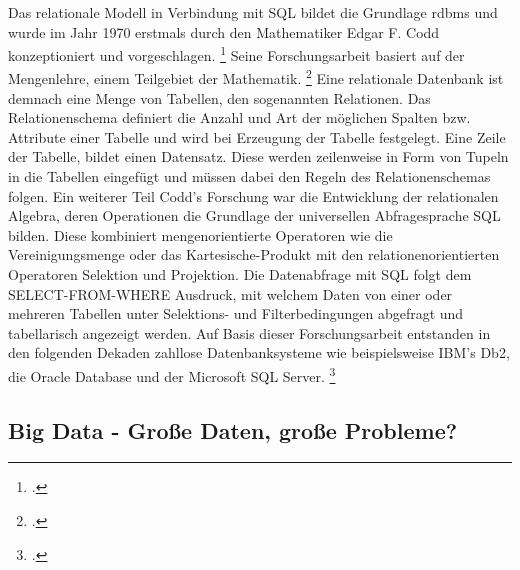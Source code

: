 Das relationale Modell in Verbindung mit SQL bildet die Grundlage \ac{rdbms} und wurde im Jahr 1970 erstmals durch den Mathematiker Edgar F. Codd konzeptioniert und vorgeschlagen. \footcite{coddRelationalModelData1970} Seine Forschungsarbeit basiert auf der Mengenlehre, einem Teilgebiet der Mathematik. \footcite[S. 66]{langerDevelopingPathData2023} Eine relationale Datenbank ist demnach eine Menge von Tabellen, den sogenannten Relationen. Das Relationenschema definiert die Anzahl und Art der möglichen Spalten bzw. Attribute einer Tabelle und wird bei Erzeugung der Tabelle festgelegt. Eine Zeile der Tabelle, bildet einen Datensatz. Diese werden zeilenweise in Form von Tupeln in die Tabellen eingefügt und müssen dabei den Regeln des Relationenschemas folgen. Ein weiterer Teil Codd's Forschung war die Entwicklung der relationalen Algebra, deren Operationen die Grundlage der universellen Abfragesprache SQL bilden. Diese kombiniert mengenorientierte Operatoren wie die Vereinigungsmenge oder das Kartesische-Produkt mit den relationenorientierten Operatoren Selektion und Projektion. Die Datenabfrage mit SQL folgt dem SELECT-FROM-WHERE Ausdruck, mit welchem Daten von einer oder mehreren Tabellen unter Selektions- und Filterbedingungen abgefragt und tabellarisch angezeigt werden. Auf Basis dieser Forschungsarbeit entstanden in den folgenden Dekaden zahllose Datenbanksysteme wie beispielsweise IBM's Db2, die Oracle Database und der Microsoft SQL Server. \footcite[S. 15-24]{meierWerkzeugeDigitalenWirtschaft2018}


\subsection{Big Data - Große Daten, große Probleme?}

